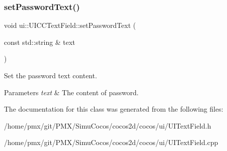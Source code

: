 \subsubsection{\texorpdfstring{set\+Password\+Text()}{setPasswordText()}\hspace{0.1cm}{\footnotesize\ttfamily [2/2]}}
{\footnotesize\ttfamily void ui\+::\+U\+I\+C\+C\+Text\+Field\+::set\+Password\+Text (\begin{DoxyParamCaption}\item[{const std\+::string \&}]{text }\end{DoxyParamCaption})}



Set the password text content. 


\begin{DoxyParams}{Parameters}
{\em text} & The content of password. \\
\hline
\end{DoxyParams}


The documentation for this class was generated from the following files\+:\begin{DoxyCompactItemize}
\item 
/home/pmx/git/\+P\+M\+X/\+Simu\+Cocos/cocos2d/cocos/ui/U\+I\+Text\+Field.\+h\item 
/home/pmx/git/\+P\+M\+X/\+Simu\+Cocos/cocos2d/cocos/ui/U\+I\+Text\+Field.\+cpp\end{DoxyCompactItemize}
